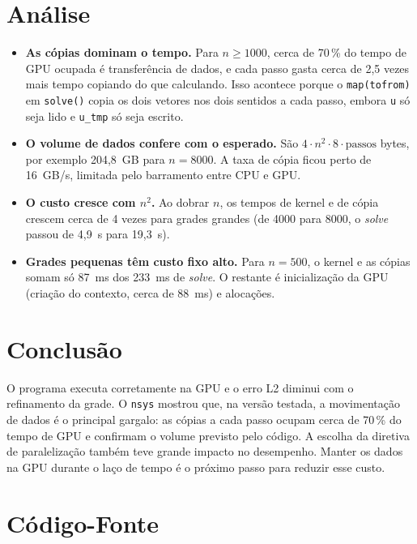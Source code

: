 \documentclass[a4paper,12pt]{article}
\begin{document}
\section{Análise}

\begin{itemize}
    \item \textbf{As cópias dominam o tempo.} Para $n \geq 1000$, cerca de 70\,\% do tempo de GPU ocupada é transferência de dados, e cada passo gasta cerca de 2,5 vezes mais tempo copiando do que calculando. Isso acontece porque o \texttt{map(tofrom)} em \texttt{solve()} copia os dois vetores nos dois sentidos a cada passo, embora \texttt{u} só seja lido e \texttt{u\_tmp} só seja escrito.
    \item \textbf{O volume de dados confere com o esperado.} São $4 \cdot n^2 \cdot 8 \cdot \text{passos}$ bytes, por exemplo 204{,}8~GB para $n = 8000$. A taxa de cópia ficou perto de 16~GB/s, limitada pelo barramento entre CPU e GPU.
    \item \textbf{O custo cresce com $n^2$.} Ao dobrar $n$, os tempos de kernel e de cópia crescem cerca de 4 vezes para grades grandes (de 4000 para 8000, o \emph{solve} passou de 4{,}9~s para 19{,}3~s).
    \item \textbf{Grades pequenas têm custo fixo alto.} Para $n = 500$, o kernel e as cópias somam só 87~ms dos 233~ms de \emph{solve}. O restante é inicialização da GPU (criação do contexto, cerca de 88~ms) e alocações.
 \end{itemize}

\section{Conclusão}

O programa executa corretamente na GPU e o erro L2 diminui com o refinamento da grade. O \texttt{nsys} mostrou que, na versão testada, a movimentação de dados é o principal gargalo: as cópias a cada passo ocupam cerca de 70\,\% do tempo de GPU e confirmam o volume previsto pelo código. A escolha da diretiva de paralelização também teve grande impacto no desempenho. Manter os dados na GPU durante o laço de tempo é o próximo passo para reduzir esse custo.

\newpage
\appendix

\section{Código-Fonte}


\end{document}

